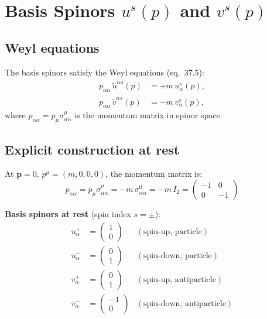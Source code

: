 \documentclass[12pt]{article}
\begin{document}
\section{Basis Spinors \texorpdfstring{$u^s(p)$}{u} and \texorpdfstring{$v^s(p)$}{v}}

\subsection{Weyl equations}

The basis spinors satisfy the Weyl equations (eq.~37.5):
\begin{align}
  p_{\alpha\dot\alpha}\,\tilde u^{\dot\alpha s}(p) &= +m\,u^s_\alpha(p),
  \tag{37.5a}\\
  p_{\alpha\dot\alpha}\,\tilde v^{\dot\alpha s}(p) &= -m\,v^s_\alpha(p),
  \tag{37.5b}
\end{align}
where $p_{\alpha\dot\alpha} = p_\mu\sigma^\mu_{\alpha\dot\alpha}$ is the momentum matrix in spinor space.

\subsection{Explicit construction at rest}

At $\mathbf{p}=0$, $p^\mu = (m,0,0,0)$, the momentum matrix is:
\[
  p_{\alpha\dot\alpha} = p_\mu\sigma^\mu_{\alpha\dot\alpha}
  = -m\,\sigma^0_{\alpha\dot\alpha} = -m\,I_2
  = \begin{pmatrix}-1 & 0 \\ 0 & -1\end{pmatrix}
\]

\textbf{Basis spinors at rest} (spin index $s = \pm$):
\begin{align*}
  u^+_\alpha &= \begin{pmatrix}1 \\ 0\end{pmatrix} & (\text{spin-up, particle})\\
  u^-_\alpha &= \begin{pmatrix}0 \\ 1\end{pmatrix} & (\text{spin-down, particle})\\
  v^+_\alpha &= \begin{pmatrix}0 \\ 1\end{pmatrix} & (\text{spin-up, antiparticle})\\
  v^-_\alpha &= \begin{pmatrix}-1 \\ 0\end{pmatrix} & (\text{spin-down, antiparticle})
\end{align*}
\end{document}
